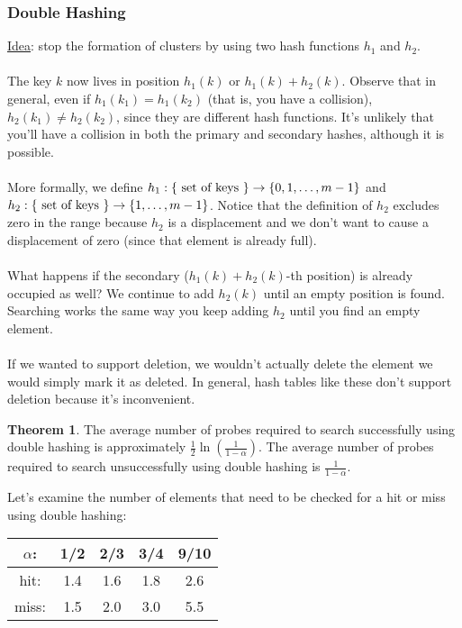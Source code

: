 \documentclass[]{article}
\theoremstyle{definition}
\newtheorem*{theorem}{Theorem}
\DeclarePairedDelimiter{\set}{\lbrace}{\rbrace}
\begin{document}
			\subsubsection{Double Hashing}
				\underline{Idea}: stop the formation of clusters by using two hash functions $h_1$ and $h_2$.
				\\ \\
				The key $k$ now lives in position $h_1(k)$ or $h_1(k) + h_2(k)$. Observe that in general, even if $h_1(k_1) = h_1(k_2)$ (that is, you have a collision), $h_2(k_1) \ne h_2(k_2)$, since they are different hash functions. It's unlikely that you'll have a collision in both the primary and secondary hashes, although it is possible.
				\\ \\
				More formally, we define $h_1: \set{\text{ set of keys }} \to \set{0, 1, \ldots, m - 1}$ and $h_2: \set{\text{ set of keys }} \to \set{1, \ldots, m - 1}$. Notice that the definition of $h_2$ excludes zero in the range because $h_2$ is a displacement and we don't want to cause a displacement of zero (since that element is already full).
				\\ \\
				What happens if the secondary ($h_1(k) + h_2(k)$-th position) is already occupied as well? We continue to add $h_2(k)$ until an empty position is found. Searching works the same way \textendash{} you keep adding $h_2$ until you find an empty element.
				\\ \\
				If we wanted to support deletion, we wouldn't actually delete the element \textendash{} we would simply mark it as deleted. In general, hash tables like these don't support deletion because it's inconvenient.
				\begin{theorem}
					The average number of probes required to search successfully using double hashing is approximately $\frac{1}{2} \ln \left( \frac{1}{1 - \alpha} \right)$. The average number of probes required to search unsuccessfully using double hashing is $\frac{1}{1 - \alpha}$.
				\end{theorem}
				
				Let's examine the number of elements that need to be checked for a hit or miss using double hashing:
				\begin{center}
					\begin{tabular}{c|c|c|c|c}
						$\alpha$: & 1/2 & 2/3 & 3/4 & 9/10 \\ \hline
						hit: & 1.4 & 1.6 & 1.8 & 2.6 \\
						miss: & 1.5 & 2.0 & 3.0 & 5.5
					\end{tabular}
				\end{center}
\end{document}

